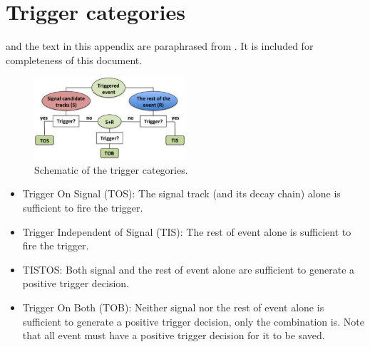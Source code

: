 \chapter{Trigger categories}
\label{appx:trigger-cat}

 and the text in this appendix are paraphrased from
\cite{LHCb-PUB-2014-039}.
It is included for completeness of this document.

\begin{figure}[htb]
    \centering
    \includegraphics[width=0.5\textwidth]{./figs-trigger-categories/trigger_categories.pdf}
    \caption{Schematic of the trigger categories.}
    \label{fig:trigger-cat}
\end{figure}

\begin{itemize}
    \item Trigger On Signal (TOS): The signal track (and its decay chain) alone
        is sufficient to fire the trigger.
    \item Trigger Independent of Signal (TIS): The rest of event alone is
        sufficient to fire the trigger.
    \item TISTOS: Both signal and the rest of event alone are sufficient to
        generate a positive trigger decision.
    \item Trigger On Both (TOB): Neither signal nor the rest of event alone is
        sufficient to generate a positive trigger decision, only the combination
        is.
        Note that all event must have a positive trigger decision for it to be
        saved.
\end{itemize}
